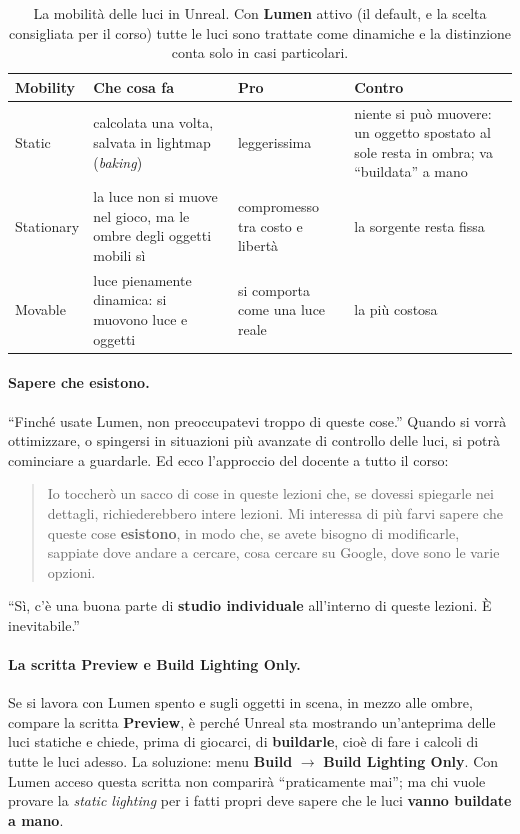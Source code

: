 \begin{table}[htbp]
\centering
\small
\begin{tabular}{@{}p{2.2cm}p{3.6cm}p{3.4cm}p{3.4cm}@{}}
\toprule
\textbf{Mobility} & \textbf{Che cosa fa} & \textbf{Pro} & \textbf{Contro} \\
\midrule
Static & calcolata una volta, salvata in lightmap (\emph{baking}) &
  leggerissima & niente si può muovere: un oggetto spostato al sole resta in
  ombra; va ``buildata'' a mano \\
\addlinespace
Stationary & la luce non si muove nel gioco, ma le ombre degli oggetti mobili sì &
  compromesso tra costo e libertà & la sorgente resta fissa \\
\addlinespace
Movable & luce pienamente dinamica: si muovono luce e oggetti &
  si comporta come una luce reale & la più costosa \\
\bottomrule
\end{tabular}
\caption{La mobilità delle luci in Unreal. Con \textbf{Lumen} attivo (il default,
e la scelta consigliata per il corso) tutte le luci sono trattate come dinamiche e
la distinzione conta solo in casi particolari.}
\label{gd14:tab:mobilita}
\end{table}

\paragraph{Sapere che esistono.} ``Finché usate Lumen, non preoccupatevi troppo di
queste cose.'' Quando si vorrà ottimizzare, o spingersi in situazioni più avanzate
di controllo delle luci, si potrà cominciare a guardarle. Ed ecco l'approccio del
docente a tutto il corso:
\begin{quote}
Io toccherò un sacco di cose in queste lezioni che, se dovessi spiegarle nei
dettagli, richiederebbero intere lezioni. Mi interessa di più farvi sapere che
queste cose \textbf{esistono}, in modo che, se avete bisogno di modificarle,
sappiate dove andare a cercare, cosa cercare su Google, dove sono le varie opzioni.
\end{quote}
``Sì, c'è una buona parte di \textbf{studio individuale} all'interno di queste
lezioni. È inevitabile.''

\paragraph{La scritta Preview e Build Lighting Only.} Se si lavora con Lumen spento
e sugli oggetti in scena, in mezzo alle ombre, compare la scritta
\textbf{Preview}, è perché Unreal sta mostrando un'anteprima delle luci statiche e
chiede, prima di giocarci, di \textbf{buildarle}, cioè di fare i calcoli di tutte
le luci adesso. La soluzione: menu \textbf{Build} $\to$ \textbf{Build Lighting
Only}. Con Lumen acceso questa scritta non comparirà ``praticamente mai''; ma chi
vuole provare la \emph{static lighting} per i fatti propri deve sapere che le luci
\textbf{vanno buildate a mano}.

